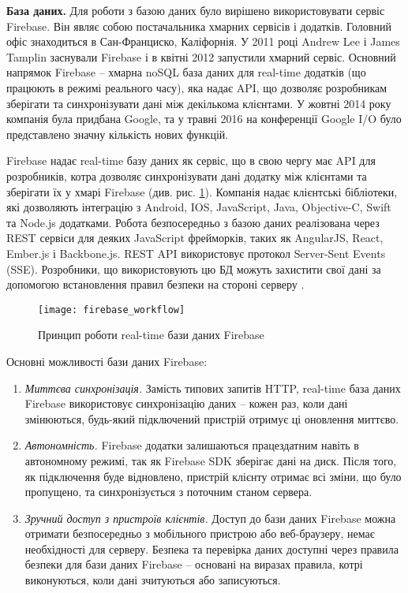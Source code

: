 \documentclass[../main.tex]{subfiles}
\begin{document}

\textbf{База даних.}
Для роботи з базою даних було вирішено використовувати сервіс Firebase. Він являє собою постачальника хмарних сервісів і додатків. Головний офіс знаходиться в Сан-Франциско, Каліфорнія. У 2011 році Andrew Lee і James Tamplin заснували Firebase і в квітні 2012 запустили хмарний сервіс. Основний напрямок Firebase -- хмарна noSQL база даних для real-time додатків (що працюють в режимі реального часу), яка надає API, що дозволяє розробникам зберігати та синхронізувати дані між декількома клієнтами. У жовтні 2014 року компанія була придбана Google, та у травні 2016 на конференції Google I/O було представлено значну кількість нових функцій.

Firebase надає real-time базу даних як сервіс, що в свою чергу має API для розробників, котра дозволяє синхронізувати дані додатку між клієнтами та зберігати їх у хмарі Firebase (див. рис. \ref{figure:firebase_workflow}). Компанія надає клієнтські бібліотеки, які дозволяють інтеграцію з Android, IOS, JavaScript, Java, Objective-C, Swift та Node.js додатками. Робота безпосередньо з базою даних реалізована через REST сервіси для деяких JavaScript фрейморків, таких як AngularJS, React, Ember.js і Backbone.js. REST API використовує протокол Server-Sent Events (SSE). Розробники, що використовують цю БД можуть захистити свої дані за допомогою встановлення правил безпеки на стороні серверу \cite{firebase_secure}.

\begin{figure}[H]
	\centering
	\texttt{[image: firebase\_workflow]}
	\caption{Принцип роботи real-time бази даних Firebase}
	\label{figure:firebase_workflow}
\end{figure}

Основні можливості бази даних Firebase:
\begin{enumerate}
	\item \textit{Миттєва синхронізація.} Замість типових запитів HTTP, real-time база даних Firebase використовує синхронізацію даних -- кожен раз, коли дані змінюються, будь-який підключений пристрій отримує ці оновлення миттєво.
	\item \textit{Автономність.} Firebase додатки залишаються працездатним навіть в автономному режимі, так як Firebase SDK зберігає дані на диск. Після того, як підключення буде відновлено, пристрій клієнту отримає всі зміни, що було пропущено, та синхронізується з поточним станом сервера.
	\item \textit{Зручний доступ з пристроїв клієнтів.} Доступ до бази даних Firebase можна отримати безпосередньо з мобільного пристрою або веб-браузеру, немає необхідності для серверу. Безпека та перевірка даних доступні через правила безпеки для бази даних Firebase -- основані на виразах правила, котрі виконуються, коли дані зчитуються або записуються.
\end{enumerate}
\end{document}
